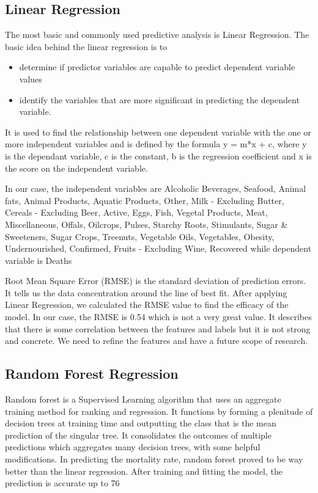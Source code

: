 \documentclass[journal,twoside,web]{ieeecolor}
\begin{document}
\subsection{Linear Regression}
The most basic and commonly used predictive analysis is Linear Regression. The basic idea behind the linear regression \cite{montgomery2021introduction} is to
\begin{itemize}
    \item determine if predictor variables are capable to predict dependent variable values
    \item identify the variables that are more significant in predicting the dependent variable.
\end{itemize}
It is used to find the relationship between one dependent variable with the one or more independent variables and is defined by the formula y = m*x + c, where y is the dependant variable, c is the constant, b is the regression coefficient and x is the score on the independent variable.

In our case, the independent variables are Alcoholic Beverages, Seafood, Animal fats, Animal Products, Aquatic Products, Other, Milk - Excluding Butter, Cereals - Excluding Beer, Active, Eggs, Fish, Vegetal Products, Meat, Miscellaneous, Offals, Oilcrops, Pulses, Starchy Roots, Stimulants, Sugar & Sweeteners, Sugar Crops, Treenuts, Vegetable Oils, Vegetables, Obesity, Undernourished, Confirmed, Fruits - Excluding Wine, Recovered while dependent variable is Deaths 

Root Mean Square Error (RMSE) is the standard deviation of prediction errors. It tells us the data concentration around the line of best fit. After applying Linear Regression, we calculated the RMSE \cite{chai2014root} value to find the efficacy of the model.  In our case, the RMSE is 0.54 which is not a very great value. It describes that there is some correlation between the features and labels but it is not strong and concrete. We need to refine the features and have a future scope of research.


\subsection{Random Forest Regression}
Random forest is a Supervised Learning algorithm \cite{liaw2002classification} that uses an aggregate training method for ranking and regression.
It functions by forming a plenitude of decision trees at training time and outputting the class that is the mean prediction of the singular tree. It consolidates the outcomes of multiple predictions which aggregates many decision trees, with some helpful modifications.
In predicting the mortality rate, random forest proved to be way better than the linear regression. After training and fitting the model, the prediction is accurate up to 76%
\end{document}

